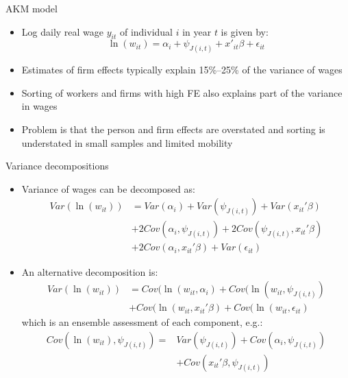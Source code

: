 \documentclass[notes=show]{beamer}
\begin{document}
\begin{frame}{AKM model}
\begin{itemize} 
    \item Log daily real wage $y_{it}$ of individual $i$ in year $t$ is given by:
    \begin{equation*}
	\ln(w_{it}) = \alpha_i + \psi_{J(i,t)} + x'_{it}\beta + \epsilon_{it}
    \end{equation*}
\item Estimates of firm effects typically explain 15\%–25\% of the variance of wages \medskip
\item Sorting of workers and firms with high FE also explains part of the variance in wages \medskip
\item Problem is that the person and firm effects are overstated and sorting is understated in small samples and limited mobility
\end{itemize}
\end{frame}

\begin{frame}{Variance decompositions}
\begin{itemize}
\item Variance of wages can be decomposed as:
    \begin{align*}
	    Var(\ln(w_{it}))& = Var(\alpha_i)+Var(\psi_{J(i,t)})+Var(x_{it}'\beta) \tag{3} \\
				&+ 2Cov(\alpha_i,\psi_{J(i,t)})+2Cov(\psi_{J(i,t)},x_{it}'\beta)  \\
				&+ 2Cov(\alpha_i,x_{it}'\beta) + Var(\epsilon_{it})
	\end{align*}
\item An alternative decomposition is:
    \begin{align*}
		Var(\ln(w_{it}))& = Cov(\ln(w_{it},\alpha_i) + Cov(\ln(w_{it},\psi_{J(i,t)}) \tag{4} \\
				& + Cov(\ln(w_{it},x_{it}'\beta) + Cov(\ln(w_{it}, \epsilon_{it})
    \end{align*}
which is an ensemble assessment of each component, e.g.:
\begin{align*}
    Cov(\ln(w_{it}),\psi_{J(i,t)}) = & Var(\psi_{J(i,t)}) + Cov(\alpha_{i},\psi_{J(i,t)}) \\
    & + Cov(x_{it}'\beta,\psi_{J(i,t)})
\end{align*}
\end{itemize}
\end{frame}
\end{document}
